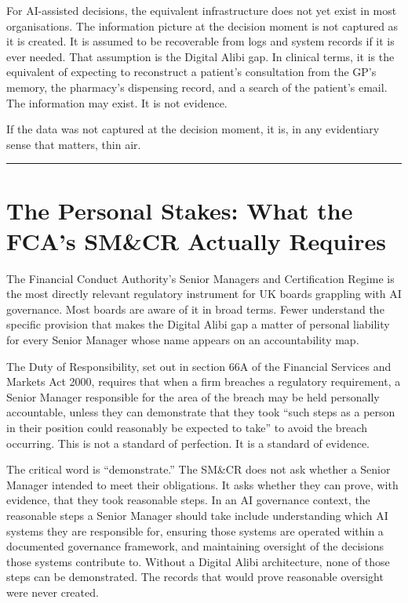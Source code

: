 For AI-assisted decisions, the equivalent infrastructure does not yet exist in most organisations. The information picture at the decision moment is not captured as it is created. It is assumed to be recoverable from logs and system records if it is ever needed. That assumption is the Digital Alibi gap. In clinical terms, it is the equivalent of expecting to reconstruct a patient's consultation from the GP's memory, the pharmacy's dispensing record, and a search of the patient's email. The information may exist. It is not evidence.

If the data was not captured at the decision moment, it is, in any evidentiary sense that matters, thin air.

\begin{center}\rule{0.5\linewidth}{0.5pt}\end{center}

\section{The Personal Stakes: What the FCA's SM\&CR Actually Requires}

The Financial Conduct Authority's Senior Managers and Certification Regime is the most directly relevant regulatory instrument for UK boards grappling with AI governance. Most boards are aware of it in broad terms. Fewer understand the specific provision that makes the Digital Alibi gap a matter of personal liability for every Senior Manager whose name appears on an accountability map.

The Duty of Responsibility, set out in section 66A of the Financial Services and Markets Act 2000, requires that when a firm breaches a regulatory requirement, a Senior Manager responsible for the area of the breach may be held personally accountable, unless they can demonstrate that they took ``such steps as a person in their position could reasonably be expected to take'' to avoid the breach occurring. This is not a standard of perfection. It is a standard of evidence.

The critical word is ``demonstrate.'' The SM\&CR does not ask whether a Senior Manager intended to meet their obligations. It asks whether they can prove, with evidence, that they took reasonable steps. In an AI governance context, the reasonable steps a Senior Manager should take include understanding which AI systems they are responsible for, ensuring those systems are operated within a documented governance framework, and maintaining oversight of the decisions those systems contribute to. Without a Digital Alibi architecture, none of those steps can be demonstrated. The records that would prove reasonable oversight were never created.

